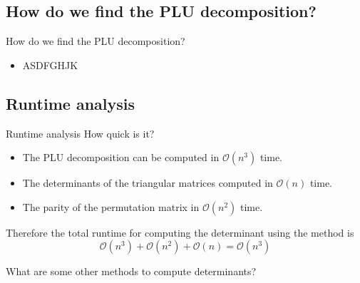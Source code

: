 \documentclass{beamer}
\begin{document}
\subsection{How do we find the PLU decomposition?}

\begin{frame}{How do we find the PLU decomposition?}
\begin{itemize}
        \item ASDFGHJK
    \end{itemize}


\end{frame}

\subsection{Runtime analysis}

\begin{frame}{Runtime analysis}
    How quick is it?
    \begin{itemize}
        \item The PLU decomposition can be computed in $\mathcal{O}(n^3)$ time.
        \item The determinants of the triangular matrices computed in $\mathcal{O}(n)$ time.
        \item The parity of the permutation matrix in $\mathcal{O}(n^2)$ time.
    \end{itemize}

    Therefore the total runtime for computing the determinant using the method is
    \[
        \mathcal{O}(n^3) + \mathcal{O}(n^2) + \mathcal{O}(n) = \mathcal{O}(n^3)
    \]

    \begin{exampleblock}{}
        What are some other methods to compute determinants?
    \end{exampleblock}

\end{frame}



\end{document}
